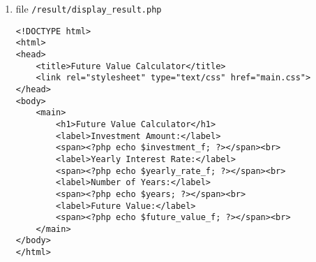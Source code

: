 \begin{enumerate}
\item file \texttt{/result/display\_result.php}
\lstset{language=php,tabsize=2}
\begin{lstlisting}
<!DOCTYPE html>
<html>
<head>
	<title>Future Value Calculator</title>
	<link rel="stylesheet" type="text/css" href="main.css">
</head>
<body>
	<main>
		<h1>Future Value Calculator</h1>
		<label>Investment Amount:</label>
		<span><?php echo $investment_f; ?></span><br>
		<label>Yearly Interest Rate:</label>
		<span><?php echo $yearly_rate_f; ?></span><br>
		<label>Number of Years:</label>
		<span><?php echo $years; ?></span><br>
		<label>Future Value:</label>
		<span><?php echo $future_value_f; ?></span><br>
	</main>
</body>
</html>
\end{lstlisting}
\end{enumerate}

